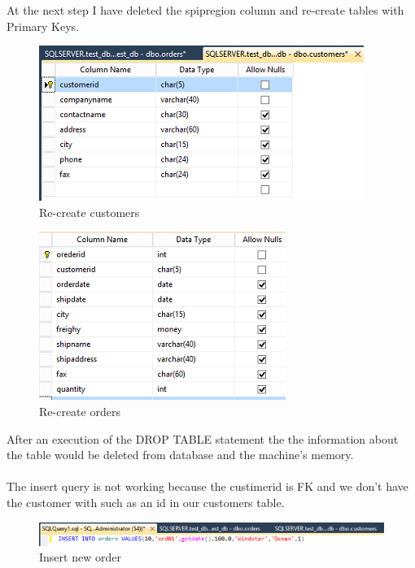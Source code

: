 \documentclass[english]{article}
\begin{document}
At the next step I have deleted the spipregion column and re-create tables with Primary Keys.
\begin{figure}[h!]
\centerline{\includegraphics[scale=0.8]{SQLCreateDB/PKcustomer}}
\caption{Re-create customers}
\end{figure}

\begin{figure}[H]
\centerline{\includegraphics[scale=0.8]{SQLCreateDB/PKorder}}
\caption{Re-create orders}
\end{figure}
After an execution of the DROP TABLE statement the the information about the table would be deleted from database and the machine's memory.\\\\
The insert query is not working because the custimerid is FK and we don't have the customer with such as an id in our customers table.
\begin{figure}[H]
\centerline{\includegraphics[scale=0.8]{SQLCreateDB/InsertWrong}}
\caption{Insert new order }
\end{figure}
\end{document}
